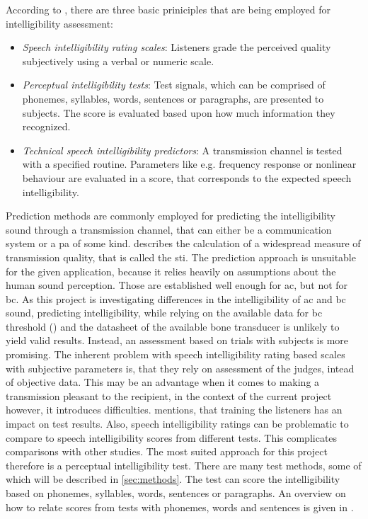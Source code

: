 According to \citep{arl_us_army}, there are three basic priniciples that are being employed for intelligibility assessment:
\begin{itemize}
\item \textit{Speech intelligibility rating scales}: Listeners grade the perceived quality subjectively using a verbal or numeric scale.
\item \textit{Perceptual intelligibility tests}:  Test signals, which can be comprised of phonemes, syllables, words, sentences or paragraphs, are presented to subjects. The score is evaluated based upon how much information they recognized.
\item \textit{Technical speech intelligibility predictors}: A transmission channel is tested with a specified routine. Parameters like e.g. frequency response or nonlinear behaviour are evaluated in a score, that corresponds to the expected speech intelligibility.
\end{itemize}
Prediction methods are commonly employed for predicting the intelligibility sound through a transmission channel, that can either be a communication system or a \gls{pa} of some kind. \citep{iec_60268} describes the calculation of a widespread measure of transmission quality, that is called the \gls{sti}. 
The prediction approach is unsuitable for the given application, because it relies heavily on assumptions about the human sound perception. Those are established well enough for \gls{ac}, but not for \gls{bc}. As this project is investigating differences in the intelligibility of \gls{ac} and \gls{bc} sound, predicting intelligibility, while relying on the available data for \gls{bc} threshold (\citep{iso_389-3}) and the datasheet of the available bone transducer is unlikely to yield valid results.
Instead, an assessment based on trials with subjects is more promising.
The inherent problem with speech intelligibility rating based scales with subjective parameters is, that they rely on assessment of the judges, intead of objective data. This may be an advantage when it comes to making a transmission pleasant to the recipient, in the context of the current project however, it introduces difficulties.
\citep[Sec. 5.1]{arl_us_army} mentions, that training the listeners has an impact on test results. Also, speech intelligibility ratings can be problematic to compare to speech intelligibility scores from different tests. This complicates comparisons with other studies.
The most suited approach for this project therefore is a perceptual intelligibility test. There are many test methods, some of which will be described in \autoref{sec:methods}. The test can score the intelligibility based on phonemes, syllables, words, sentences or paragraphs. An overview on how to relate scores from tests with phonemes, words and sentences is given in \citep{olsen_1997}.


